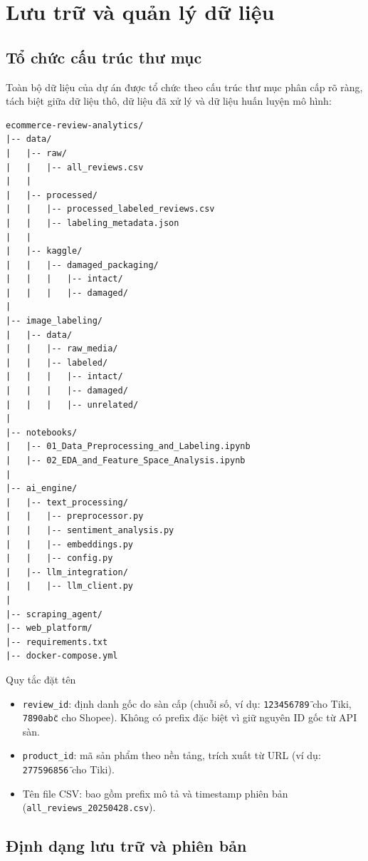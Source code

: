 \section{Lưu trữ và quản lý dữ liệu}

\subsection{Tổ chức cấu trúc thư mục}

Toàn bộ dữ liệu của dự án được tổ chức theo cấu trúc thư mục phân cấp rõ ràng, tách biệt giữa dữ liệu thô, dữ liệu đã xử lý và dữ liệu huấn luyện mô hình:

\begin{verbatim}
ecommerce-review-analytics/
|-- data/
|   |-- raw/
|   |   |-- all_reviews.csv         
|   |
|   |-- processed/
|   |   |-- processed_labeled_reviews.csv  
|   |   |-- labeling_metadata.json        
|   |
|   |-- kaggle/
|   |   |-- damaged_packaging/
|   |   |   |-- intact/
|   |   |   |-- damaged/
|
|-- image_labeling/
|   |-- data/
|   |   |-- raw_media/             
|   |   |-- labeled/
|   |   |   |-- intact/
|   |   |   |-- damaged/
|   |   |   |-- unrelated/
|
|-- notebooks/
|   |-- 01_Data_Preprocessing_and_Labeling.ipynb
|   |-- 02_EDA_and_Feature_Space_Analysis.ipynb
|
|-- ai_engine/
|   |-- text_processing/
|   |   |-- preprocessor.py
|   |   |-- sentiment_analysis.py
|   |   |-- embeddings.py
|   |   |-- config.py
|   |-- llm_integration/
|   |   |-- llm_client.py
|
|-- scraping_agent/
|-- web_platform/
|-- requirements.txt
|-- docker-compose.yml
\end{verbatim}

\begin{infobox}{Quy tắc đặt tên}
\begin{itemize}
    \item \texttt{review\_id}: định danh gốc do sàn cấp (chuỗi số, ví dụ: \texttt{\"123456789\"} cho Tiki, \texttt{\"7890abc\"} cho Shopee). Không có prefix đặc biệt vì giữ nguyên ID gốc từ API sàn.
    \item \texttt{product\_id}: mã sản phẩm theo nền tảng, trích xuất từ URL (ví dụ: \texttt{\"277596856\"} cho Tiki).
    \item Tên file CSV: bao gồm prefix mô tả và timestamp phiên bản (\texttt{all\_reviews\_20250428.csv}).
\end{itemize}
\end{infobox}

\subsection{Định dạng lưu trữ và phiên bản}

